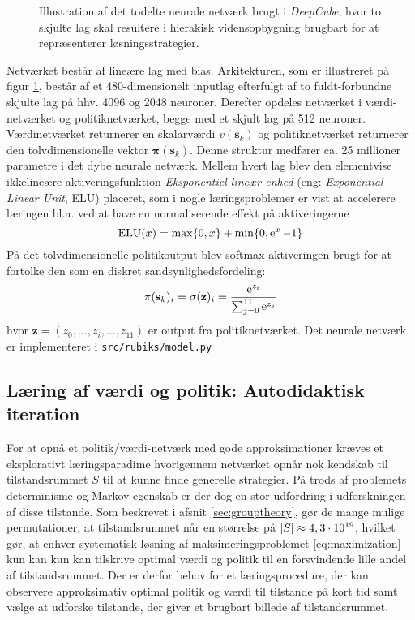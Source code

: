 \documentclass[../main.tex]{subfiles}
\begin{document}
\begin{figure}[H]
	\centering

\caption{Illustration af det todelte neurale netværk brugt i \textit{DeepCube}, hvor to skjulte lag skal resultere i hierakisk vidensopbygning brugbart for at repræsenterer løsningsstrategier.}
\label{fig:DNN}
\end{figure}
\noindent
Netværket består af lineære lag med bias.
Arkitekturen, som er illustreret på figur \ref{fig:DNN}, består af et 480-dimensionelt inputlag efterfulgt af to fuldt-forbundne skjulte lag på hhv. 4096 og 2048 neuroner.
Derefter opdeles netværket i værdi-netværket og politiknetværket, begge med et skjult lag på 512 neuroner.
Værdinetværket returnerer en skalarværdi \(v(\mathbf s_k)\) og politiknetværket returnerer den tolvdimensionelle vektor \(\bm \pi (\mathbf s_k)\).
Denne struktur medfører ca. 25 millioner parametre i det dybe neurale netværk.
Mellem hvert lag blev den elementvise ikkelineære aktiveringsfunktion \textit{Eksponentiel lineær enhed} (eng: \textit{Exponential Linear Unit}, ELU) placeret, som i nogle læringsproblemer er vist at accelerere læringen bl.a. ved at have en normaliserende effekt på aktiveringerne \cite{ELU} 
\[
\operatorname{ELU}(x) = \operatorname*{max}\{0, x\} + \operatorname{min}\{0, \operatorname{e}^{x} -1\}
\]
På det tolvdimensionelle politikoutput blev softmax-aktiveringen brugt for at fortolke den som en diskret sandsynlighedsfordeling:
\[
\pi(\mathbf s_k)_i = \sigma(\mathbf z)_i = \frac{\operatorname{e}^{z_i}}{\sum_{j=0}^{11} \operatorname{e}^{z_j}}
\]
hvor \(\mathbf z=(z_0, ..., z_i, ..., z_{11})\) er output fra politiknetværket.
Det neurale netværk er implementeret i \texttt{src/rubiks/model.py}

\subsection*{Læring af værdi og politik: Autodidaktisk iteration}
For at opnå et politik/værdi-netværk med gode approksimationer kræves et eksplorativt læringsparadime hvorigennem netværket opnår nok kendskab til tilstandsrummet \(S\) til at kunne finde generelle strategier. 
På trods af problemets determinisme og Markov-egenskab er der dog en stor udfordring i udforskningen af disse tilstande.
Som beskrevet i afsnit \ref{sec:grouptheory}, gør de mange mulige permutationer, at tilstandsrummet når en størrelse på \(|S|\approx 4,3\cdot10^{19}\), hvilket gør, at enhver systematisk løsning af maksimeringsproblemet \ref{eq:maximization} kun kan kun kan tilskrive optimal værdi og politik til en forsvindende lille andel af tilstandsrummet.
Der er derfor behov for et læringsprocedure, der kan observere approksimativ optimal politik og værdi til tilstande på kort tid samt vælge at udforske tilstande, der giver et brugbart billede af tilstandsrummet.
\end{document}
